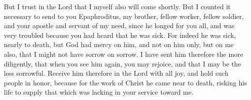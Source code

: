 {But I trust in the Lord that I myself also will come shortly.
But I counted it necessary to send to you Epaphroditus, my brother, fellow worker, fellow soldier, and your apostle and servant of my need,
since he longed for you all, and was very troubled because you had heard that he was sick.
For indeed he was sick, nearly to death, but God had mercy on him, and not on him only, but on me also, that I might not have sorrow on sorrow.
I have sent him therefore the more diligently, that when you see him again, you may rejoice, and that I may be the less sorrowful.
Receive him therefore in the Lord with all joy, and hold such people in honor,
because for the work of Christ he came near to death, risking his life to supply that which was lacking in your service toward me.

}
